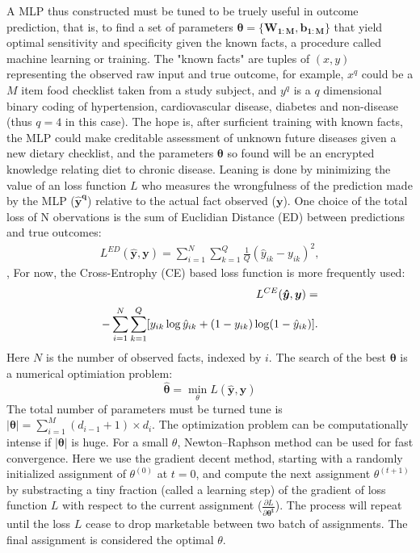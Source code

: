A MLP thus constructed must be tuned to be truely useful in outcome prediction, that is, to find a set of parameters $\boldsymbol{\theta}=\{\boldsymbol{W_{1:M}},\boldsymbol{b_{1:M}}\}$ that yield optimal sensitivity and specificity given the known facts, a procedure called machine learning or training. The "known facts" are tuples of $(x, y)$ representing the observed raw input and true outcome, for example, $x^q$ could be a $M$ item food checklist taken from a study subject, and $y^q$ is a $q$ dimensional binary coding of hypertension, cardiovascular disease, diabetes and non-disease (thus $q=4$ in this case). The hope is, after surficient training with known facts, the MLP could make creditable assessment of unknown future diseases given a new dietary checklist, and the parameters $\boldsymbol{\theta}$ so found will be an encrypted knowledge relating diet to chronic disease. Leaning is done by minimizing the value of an loss function $L$ who measures the wrongfulness of the prediction made by the MLP ($\boldsymbol{\hat{y}^q}$) relative to the actual fact observed ($\boldsymbol{y}$). 
One choice of the total loss of N obervations is the sum of Euclidian Distance (ED) between predictions and true outcomes:
\begin{equation*}
\begin{split}
  L^{ED}(\boldsymbol{\hat{y}},\boldsymbol{y}) = \sum_{i=1}^N\sum_{k=1}^Q\frac{1}{Q}(\hat{y}_{ik}-y_{ik})^2,
\end{split}
\end{equation*},
For now, the Cross-Entrophy (CE) based loss function is more frequently used:
\begin{equation*}
\begin{split}
\noindent L^{CE}(\boldsymbol{\hat{y}},\boldsymbol{y}) = \\
  -\sum_{i=1}^N\sum_{k=1}^Q[y_{ik}\log{\hat{y}_{ik}}+(1-y_{ik})\log(1-\hat{y}_{ik})].
\end{split}
\end{equation*}
Here $N$ is the number of observed facts, indexed by $i$. The search of the best $\boldsymbol{\theta}$ is a numerical optimiation problem:
\[\boldsymbol{\hat{\theta}}=\min_{\theta}L(\boldsymbol{\hat{y}},\boldsymbol{y})\]
The total number of parameters must be turned tune is $|\boldsymbol{\theta}|=\sum_{i=1}^{M}{(d_{i-1}+1) \times d_i}$. The optimization problem can be computationally intense if $|\boldsymbol{\theta}|$ is huge. For a small $\theta$, Newton–Raphson method can be used for fast convergence. Here we use the gradient decent method, starting with a randomly initialized assignment of $\theta^(0)$ at $t=0$, and compute the next assignment $\theta^{(t+1)}$ by substracting a tiny fraction (called a learning step) of the gradient of loss function $L$ with respect to the current assignment ($\frac{\partial L}{\partial \boldsymbol{\theta^{t}}}$). The process will repeat until the loss $L$ cease to drop marketable between two batch of assignments. The final assignment is considered the optimal $\theta$.

